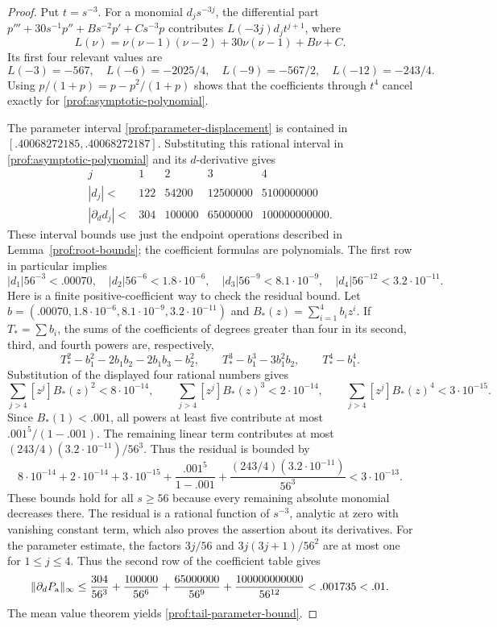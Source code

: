 \begin{proof}
Put $t=s^{-3}$.  For a monomial $d_js^{-3j}$, the differential part
$p'''+30s^{-1}p''+Bs^{-2}p'+Cs^{-3}p$ contributes
$L(-3j)d_jt^{j+1}$, where
\[
 L(\nu)=\nu(\nu-1)(\nu-2)+30\nu(\nu-1)+B\nu+C.
\]
Its first four relevant values are
\[
 L(-3)=-567,\quad L(-6)=-2025/4,\quad
 L(-9)=-567/2,\quad L(-12)=-243/4.
\]
Using $p/(1+p)=p-p^2/(1+p)$ shows that the coefficients through $t^4$
cancel exactly for \eqref{prof:asymptotic-polynomial}.

The parameter interval \eqref{prof:parameter-displacement} is contained
in $[.40068272185,.40068272187]$.  Substituting this rational interval
in \eqref{prof:asymptotic-polynomial} and its $d$-derivative gives
\[
\begin{array}{c|rrrr}
 j&1&2&3&4\\ \hline
 |d_j|<&122&54200&12500000&5100000000\\
 |\partial_d d_j|<&304&100000&65000000&100000000000.
\end{array}
\]
These interval bounds use just the endpoint operations described in
Lemma~\ref{prof:root-bounds}; the coefficient formulas are polynomials.
The first row in particular implies
\begin{equation}\label{prof:tail-term-bounds}
 |d_1|56^{-3}<.00070,\quad |d_2|56^{-6}<1.8\cdot10^{-6},\quad
 |d_3|56^{-9}<8.1\cdot10^{-9},\quad |d_4|56^{-12}<3.2\cdot10^{-11}.
\end{equation}
Here is a finite positive-coefficient way to check the residual bound.
Let $b=(.00070,1.8\cdot10^{-6},8.1\cdot10^{-9},3.2\cdot10^{-11})$
and $B_*(z)=\sum_{i=1}^4b_iz^i$.  If $T_*=\sum b_i$, the sums of the
coefficients of degrees greater than four in its second, third, and fourth
powers are, respectively,
\[
 T_*^2-b_1^2-2b_1b_2-2b_1b_3-b_2^2,\qquad
 T_*^3-b_1^3-3b_1^2b_2,\qquad T_*^4-b_1^4.
\]
Substitution of the displayed four rational numbers gives
\begin{equation}\label{prof:residual-arithmetic}
 \sum_{j>4}[z^j]B_*(z)^2<8\cdot10^{-14},\qquad
 \sum_{j>4}[z^j]B_*(z)^3<2\cdot10^{-14},\qquad
 \sum_{j>4}[z^j]B_*(z)^4<3\cdot10^{-15}.
\end{equation}
Since $B_*(1)<.001$, all powers at least five contribute at most
$.001^5/(1-.001)$.  The remaining linear term contributes at most
$(243/4)(3.2\cdot10^{-11})/56^3$.  Thus the residual is bounded by
\[
 8\cdot10^{-14}+2\cdot10^{-14}+3\cdot10^{-15}
 +\frac{.001^5}{1-.001}
 +\frac{(243/4)(3.2\cdot10^{-11})}{56^3}
 <3\cdot10^{-13}.
\]
These bounds hold for all $s\ge56$ because every remaining absolute
monomial decreases there.  The residual is a rational function of
$s^{-3}$, analytic at zero with vanishing constant term, which also
proves the assertion about its derivatives.  For the parameter estimate,
the factors $3j/56$ and $3j(3j+1)/56^2$ are at most one for $1\le j\le4$.
Thus the second row of the coefficient table gives
\[
 \lVert \partial_dP_{\rm a}\rVert_\infty
 \le\frac{304}{56^3}+\frac{100000}{56^6}
       +\frac{65000000}{56^9}+\frac{100000000000}{56^{12}}
 <.001735<.01.
\]
The mean value theorem yields \eqref{prof:tail-parameter-bound}.
\end{proof}

